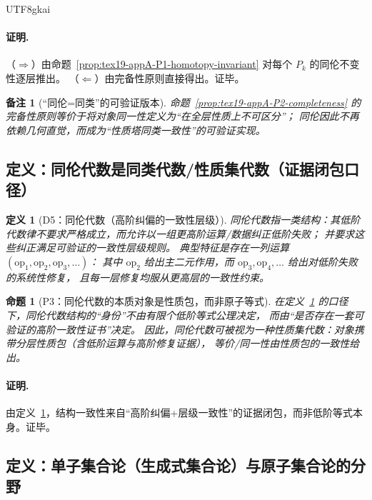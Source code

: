 \documentclass[12pt]{article}
\newtheorem{definition}{定义}[section]
\newtheorem{proposition}{命题}[section]
\newtheorem{remark}{备注}[section]
\begin{document}
\begin{CJK*}{UTF8}{gkai}
\paragraph{证明.}
（$\Rightarrow$）由命题~\ref{prop:tex19-appA-P1-homotopy-invariant} 对每个 $P_k$ 的同伦不变性逐层推出。
（$\Leftarrow$）由完备性原则直接得出。证毕。

\begin{remark}[“同伦=同类”的可验证版本]
命题~\ref{prop:tex19-appA-P2-completeness} 的完备性原则等价于将对象同一性定义为“在全层性质上不可区分”；
同伦因此不再依赖几何直觉，而成为“性质塔同类一致性”的可验证实现。
\end{remark}

\subsection{定义：同伦代数是同类代数/性质集代数（证据闭包口径）}
\label{subsec:tex19-appA-homotopy-algebra-interface}

\begin{definition}[D5：同伦代数（高阶纠偏的一致性层级）]
\label{def:tex19-appA-D5-homotopy-algebra}
同伦代数指一类结构：其低阶代数律不要求严格成立，而允许以一组更高阶运算/数据纠正低阶失败；
并要求这些纠正满足可验证的一致性层级规则。
典型特征是存在一列运算 $(\mathrm{op}_1,\mathrm{op}_2,\mathrm{op}_3,\dots)$：
其中 $\mathrm{op}_2$ 给出主二元作用，而 $\mathrm{op}_3,\mathrm{op}_4,\dots$ 给出对低阶失败的系统性修复，
且每一层修复均服从更高层的一致性约束。
\end{definition}

\begin{proposition}[P3：同伦代数的本质对象是性质包，而非原子等式]
\label{prop:tex19-appA-P3-homotopy-algebra-as-properties}
在定义~\ref{def:tex19-appA-D5-homotopy-algebra} 的口径下，同伦代数结构的“身份”不由有限个低阶等式公理决定，
而由“是否存在一套可验证的高阶一致性证书”决定。
因此，同伦代数可被视为一种性质集代数：对象携带分层性质包（含低阶运算与高阶修复证据），
等价/同一性由性质包的一致性给出。
\end{proposition}

\paragraph{证明.}
由定义~\ref{def:tex19-appA-D5-homotopy-algebra}，结构一致性来自“高阶纠偏+层级一致性”的证据闭包，而非低阶等式本身。证毕。

\subsection{定义：单子集合论（生成式集合论）与原子集合论的分野}
\label{subsec:tex19-appA-monadic-set-theory-interface}


\end{CJK*}
\end{document}
